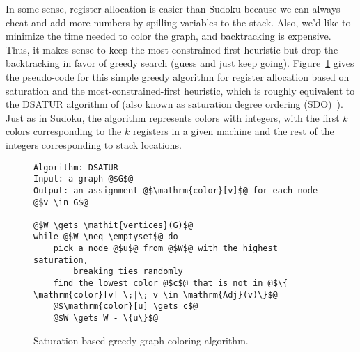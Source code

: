 \documentclass[12pt]{book}
\begin{document}
In some sense, register allocation is easier than Sudoku because we
can always cheat and add more numbers by spilling variables to the
stack. Also, we'd like to minimize the time needed to color the graph,
and backtracking is expensive. Thus, it makes sense to keep the
most-constrained-first heuristic but drop the backtracking in favor of
greedy search (guess and just keep going).
Figure~\ref{fig:satur-algo} gives the pseudo-code for this simple
greedy algorithm for register allocation based on saturation and the
most-constrained-first heuristic, which is roughly equivalent to the
DSATUR algorithm of \cite{Brelaz:1979eu} (also known as
saturation degree ordering
(SDO)~\citep{Gebremedhin:1999fk,Omari:2006uq}).  Just as in Sudoku,
the algorithm represents colors with integers, with the first $k$
colors corresponding to the $k$ registers in a given machine and the
rest of the integers corresponding to stack locations.

\begin{figure}[btp]
  \centering
\begin{lstlisting}[basicstyle=\rmfamily,deletekeywords={for,from,with,is,not,in,find},morekeywords={while},columns=fullflexible]
Algorithm: DSATUR
Input: a graph @$G$@
Output: an assignment @$\mathrm{color}[v]$@ for each node @$v \in G$@

@$W \gets \mathit{vertices}(G)$@
while @$W \neq \emptyset$@ do
    pick a node @$u$@ from @$W$@ with the highest saturation,
        breaking ties randomly
    find the lowest color @$c$@ that is not in @$\{ \mathrm{color}[v] \;|\; v \in \mathrm{Adj}(v)\}$@
    @$\mathrm{color}[u] \gets c$@
    @$W \gets W - \{u\}$@
\end{lstlisting}
  \caption{Saturation-based greedy graph coloring algorithm.}
  \label{fig:satur-algo}
\end{figure}
\end{document}
